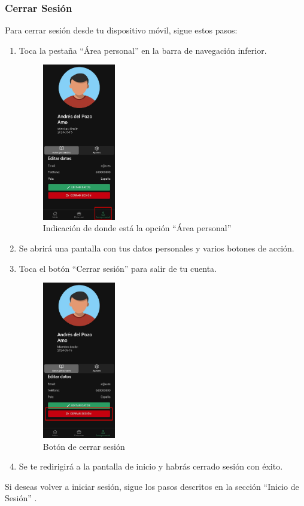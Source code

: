 \subsubsection{Cerrar Sesión}
Para cerrar sesión desde tu dispositivo móvil, sigue estos pasos:
\begin{enumerate}
	\item Toca la pestaña “Área personal” en la barra de navegación inferior.
	      \begin{figure}[H]
		      \centering
		      \includegraphics[width=0.3\textwidth]{7-Construccion/Manuales/app/P1-Perfil.png}
		      \caption{Indicación de donde está la opción “Área personal” }
	      \end{figure}
	\item Se abrirá una pantalla con tus datos personales y varios botones de acción.
	\item Toca el botón “Cerrar sesión” para salir de tu cuenta.
	      \begin{figure}[H]
		      \centering
		      \includegraphics[width=0.3\textwidth]{7-Construccion/Manuales/app/P2-CerrarSesion.png}
		      \caption{Botón de cerrar sesión}
	      \end{figure}
	\item Se te redirigirá a la pantalla de inicio y habrás cerrado sesión con éxito.
\end{enumerate}
Si deseas volver a iniciar sesión, sigue los pasos descritos en la sección “Inicio de Sesión” .

